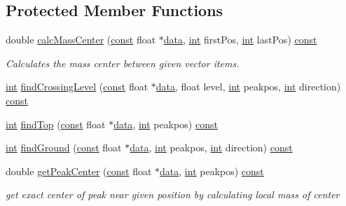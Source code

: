 \subsection*{Protected Member Functions}
\begin{DoxyCompactItemize}
\item 
double \hyperlink{classsoundtouch_1_1_peak_finder_a332225286406e853892690fd2289a5f4}{calc\+Mass\+Center} (\hyperlink{getopt1_8c_a2c212835823e3c54a8ab6d95c652660e}{const} float $\ast$\hyperlink{lib_2expat_8h_ac39e72a1de1cb50dbdc54b08d0432a24}{data}, \hyperlink{xmltok_8h_a5a0d4a5641ce434f1d23533f2b2e6653}{int} first\+Pos, \hyperlink{xmltok_8h_a5a0d4a5641ce434f1d23533f2b2e6653}{int} last\+Pos) \hyperlink{getopt1_8c_a2c212835823e3c54a8ab6d95c652660e}{const} 
\begin{DoxyCompactList}\small\item\em Calculates the mass center between given vector items. \end{DoxyCompactList}\item 
\hyperlink{xmltok_8h_a5a0d4a5641ce434f1d23533f2b2e6653}{int} \hyperlink{classsoundtouch_1_1_peak_finder_a06464b0c57ddc81937dcf633bfcc4394}{find\+Crossing\+Level} (\hyperlink{getopt1_8c_a2c212835823e3c54a8ab6d95c652660e}{const} float $\ast$\hyperlink{lib_2expat_8h_ac39e72a1de1cb50dbdc54b08d0432a24}{data}, float level, \hyperlink{xmltok_8h_a5a0d4a5641ce434f1d23533f2b2e6653}{int} peakpos, \hyperlink{xmltok_8h_a5a0d4a5641ce434f1d23533f2b2e6653}{int} direction) \hyperlink{getopt1_8c_a2c212835823e3c54a8ab6d95c652660e}{const} 
\item 
\hyperlink{xmltok_8h_a5a0d4a5641ce434f1d23533f2b2e6653}{int} \hyperlink{classsoundtouch_1_1_peak_finder_af79e083dbf32efda5b25cf68ce2d3b22}{find\+Top} (\hyperlink{getopt1_8c_a2c212835823e3c54a8ab6d95c652660e}{const} float $\ast$\hyperlink{lib_2expat_8h_ac39e72a1de1cb50dbdc54b08d0432a24}{data}, \hyperlink{xmltok_8h_a5a0d4a5641ce434f1d23533f2b2e6653}{int} peakpos) \hyperlink{getopt1_8c_a2c212835823e3c54a8ab6d95c652660e}{const} 
\item 
\hyperlink{xmltok_8h_a5a0d4a5641ce434f1d23533f2b2e6653}{int} \hyperlink{classsoundtouch_1_1_peak_finder_a19ae9bce90042ba23709f2467edbc9b7}{find\+Ground} (\hyperlink{getopt1_8c_a2c212835823e3c54a8ab6d95c652660e}{const} float $\ast$\hyperlink{lib_2expat_8h_ac39e72a1de1cb50dbdc54b08d0432a24}{data}, \hyperlink{xmltok_8h_a5a0d4a5641ce434f1d23533f2b2e6653}{int} peakpos, \hyperlink{xmltok_8h_a5a0d4a5641ce434f1d23533f2b2e6653}{int} direction) \hyperlink{getopt1_8c_a2c212835823e3c54a8ab6d95c652660e}{const} 
\item 
double \hyperlink{classsoundtouch_1_1_peak_finder_afd6a05bcdf7d5650a28128337f42c328}{get\+Peak\+Center} (\hyperlink{getopt1_8c_a2c212835823e3c54a8ab6d95c652660e}{const} float $\ast$\hyperlink{lib_2expat_8h_ac39e72a1de1cb50dbdc54b08d0432a24}{data}, \hyperlink{xmltok_8h_a5a0d4a5641ce434f1d23533f2b2e6653}{int} peakpos) \hyperlink{getopt1_8c_a2c212835823e3c54a8ab6d95c652660e}{const} 
\begin{DoxyCompactList}\small\item\em get exact center of peak near given position by calculating local mass of center \end{DoxyCompactList}\end{DoxyCompactItemize}
